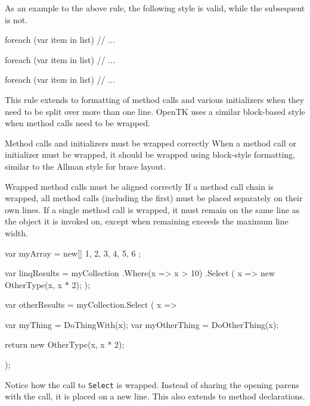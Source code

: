 \documentclass[11pt,a4paper]{article}
\newcounter{rule}[section]
\begin{document}
As an example to the above rule, the following style is valid, while the subsequent is not.

\begin{code}
foreach (var item in list)
{
    // ...
}
\end{code}

\begin{code}
foreach (var item in list) {
    // ...
}

foreach (var item in list) { // ... }
\end{code}

This rule extends to formatting of method calls and various initializers when they need to be split over more than one line. OpenTK uses a similar block-based style when method calls need to be wrapped.

\begin{must}{Method calls and initializers must be wrapped correctly}
When a method call or initializer must be wrapped, it should be wrapped using block-style formatting, similar to the Allman style for brace layout.
\end{must}

\begin{must}{Wrapped method calls must be aligned correctly}
If a method call chain is wrapped, all method calls (including the first) must be placed separately on their own lines.
If a single method call is wrapped, it must remain on the same line as the object it is invoked on, except when remaining exceeds the maximum line width.
\end{must}

\begin{code}
var myArray = new[] 
{
    1,
    2,
    3,
    4,
    5,
    6
}; 
\end{code}

\begin{code}
var linqResults = myCollection
    .Where(x => x > 10)
    .Select
    (
        x => 
            new OtherType(x, x * 2);
    );
    
var otherResults = myCollection.Select
    (
        x => 
        {
            var myThing = DoThingWith(x);
            var myOtherThing = DoOtherThing(x);
            
            return new OtherType(x, x * 2);
        }
    );
\end{code}

Notice how the call to \texttt{Select} is wrapped. Instead of sharing the opening parens with the call, it is placed on a new line. This also extends to method declarations.
\end{document}
